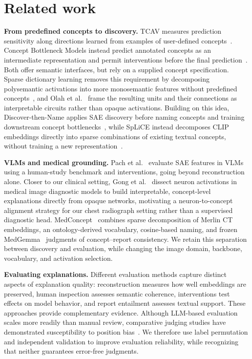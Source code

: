\section{Related work}
\textbf{From predefined concepts to discovery.} TCAV measures prediction sensitivity along directions learned from examples of user-defined concepts~\cite{kim2018tcav}. Concept Bottleneck Models instead predict annotated concepts as an intermediate representation and permit interventions before the final prediction~\cite{koh2020cbm}. Both offer semantic interfaces, but rely on a supplied concept specification. Sparse dictionary learning removes this requirement by decomposing polysemantic activations into more monosemantic features without predefined concepts~\cite{bricken2023monosemanticity}, and Olah et al.~\cite{olah2020zoom} frame the resulting units and their connections as interpretable circuits rather than opaque activations. Building on this idea, Discover-then-Name applies SAE discovery before naming concepts and training downstream concept bottlenecks~\cite{rao2024discover}, while SpLiCE instead decomposes CLIP embeddings directly into sparse combinations of existing textual concepts, without training a new representation~\cite{bhalla2024splice}.

\textbf{VLMs and medical grounding.} Pach et al.~\cite{pach2025sae} evaluate SAE features in VLMs using a human-study benchmark and interventions, going beyond reconstruction alone. Closer to our clinical setting, Gong et al.~\cite{gong2025concepts} dissect neuron activations in medical image diagnostic models to build interpretable, concept-level explanations directly from opaque networks, motivating a neuron-to-concept alignment strategy for our chest radiograph setting rather than a supervised diagnostic head. MedConcept~\cite{haque2026medconcept} combines sparse decomposition of Merlin CT embeddings, an ontology-derived vocabulary, cosine-based naming, and frozen MedGemma~\cite{sellergren2026medgemma} judgments of concept--report consistency. We retain this separation between discovery and evaluation, while changing the image domain, backbone, vocabulary, and activation selection.

\textbf{Evaluating explanations.} Different evaluation methods capture distinct aspects of explanation quality: reconstruction measures how well embeddings are preserved, human inspection assesses semantic coherence, interventions test effects on model behavior, and report entailment assesses textual support. These approaches provide complementary evidence. Although LLM-based evaluation scales more readily than manual review, comparative judging studies have demonstrated susceptibility to position bias~\cite{shi2025judging}. We therefore use label permutation and independent validation to improve evaluation reliability, while recognizing that neither guarantees error-free judgments.
